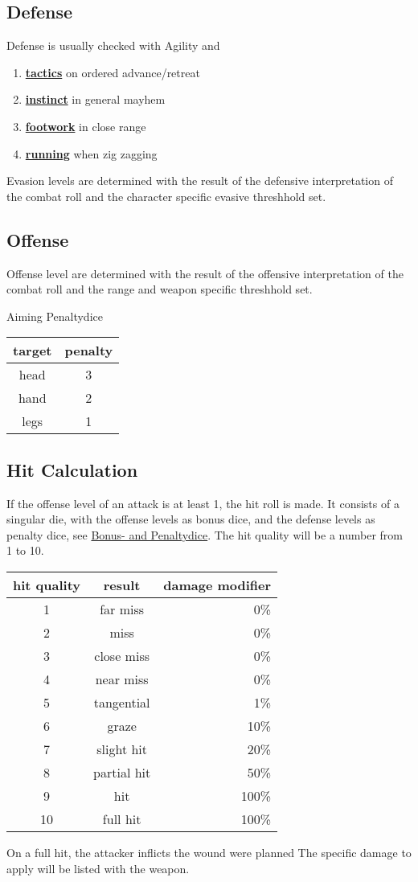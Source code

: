 \subsection{Defense}\label{subsec:defense}
Defense is usually checked with Agility and
\begin{enumerate}[label = - ]
    \item \hyperref[subsec:tactics]{\textbf{tactics}} on ordered advance/retreat
    \item \hyperref[subsec:instinct]{\textbf{instinct}} in general mayhem
    \item \hyperref[subsec:footwork]{\textbf{footwork}} in close range
    \item \hyperref[subsec:running]{\textbf{running}} when zig zagging
\end{enumerate}
Evasion levels are determined with the result of the defensive interpretation of the combat roll
and the character specific evasive threshhold set.

\subsection{Offense}\label{subsec:offense}
Offense level are determined with the result of the offensive \-interpretation of the combat roll \-and the range and
weapon \-specific threshhold set.\par
Aiming Penaltydice
\begin{tabular}{cc}
    target & penalty\\\hline
    head & 3 \\
    hand & 2 \\
    legs & 1 \\
\end{tabular}

\subsection{Hit Calculation}\label{subsec:hit}
If the offense level of an attack is at least 1, the hit roll is made.
It consists of a singular die, with the offense levels as bonus dice, and the defense levels as penalty dice,
see \hyperref[sec:bonus--and-penaltydice]{Bonus- and Penaltydice}.
The hit quality will be a number from 1 to 10. \par
\begin{tabular}{c|cr}
    hit quality & result & damage modifier \\\hline
    1 & far miss & 0\%\\
    2 & miss& 0\%\\
    3 & close miss& 0\%\\
    4 & near miss& 0\%\\
    5 & tangential& 1\%\\
    6 & graze& 10\%\\
    7 & slight hit& 20\%\\
    8 & partial hit& 50\%\\
    9 & hit& 100\%\\
    10 & full hit& 100\%\\
\end{tabular}

On a full hit, the attacker inflicts the wound were planned
The specific damage to apply will be listed with the weapon.
